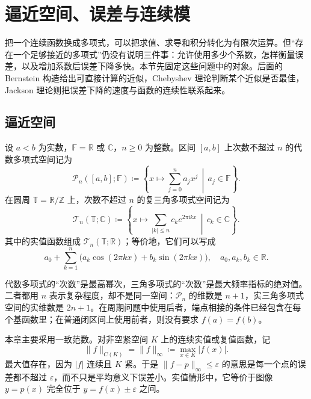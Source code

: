 \section{逼近空间、误差与连续模}
\label{b2:sec:approximation-spaces-errors}

把一个连续函数换成多项式，可以把求值、求导和积分转化为有限次运算。但“存在一个足够接近的多项式”仍没有说明三件事：允许使用多少个系数，怎样衡量误差，以及增加系数后误差下降多快。本节先固定这些问题中的对象。后面的 Bernstein 构造给出可直接计算的近似，Chebyshev 理论判断某个近似是否最佳，Jackson 理论则把误差下降的速度与函数的连续性联系起来。

\subsection{逼近空间}
\label{b2:subsec:approximation-spaces}

\begin{definition}
\label{b2:def:approximation-spaces}
设 \(a<b\) 为实数，\(\mathbb F=\mathbb R\) 或 \(\mathbb C\)，\(n\geq0\) 为整数。区间 \([a,b]\) 上次数不超过 \(n\) 的代数多项式空间记为
\[
 \mathcal P_n([a,b];\mathbb F)
 \coloneqq
 \left\{x\longmapsto\sum_{j=0}^na_jx^j\,\middle|\,a_j\in\mathbb F\right\}.
\]
在圆周 \(\mathbb T=\mathbb R/\mathbb Z\) 上，次数不超过 \(n\) 的复三角多项式空间记为
\[
 \mathcal T_n(\mathbb T;\mathbb C)
 \coloneqq
 \left\{x\longmapsto\sum_{|k|\leq n}c_ke^{2\pi\mathrm{i}kx}
       \,\middle|\,c_k\in\mathbb C\right\}.
\]
其中的实值函数组成 \(\mathcal T_n(\mathbb T;\mathbb R)\)；等价地，它们可以写成
\[
 a_0+\sum_{k=1}^n\bigl(a_k\cos(2\pi kx)+b_k\sin(2\pi kx)\bigr),
 \quad a_0,a_k,b_k\in\mathbb R.
\]
\end{definition}

代数多项式的“次数”是最高幂次，三角多项式的“次数”是最大频率指标的绝对值。二者都用 \(n\) 表示复杂程度，却不是同一空间：\(\mathcal P_n\) 的维数是 \(n+1\)，实三角多项式空间的实维数是 \(2n+1\)。在周期问题中使用后者，端点相接的条件已经包含在每个基函数里；在普通闭区间上使用前者，则没有要求 \(f(a)=f(b)\)。

\ProseParagraphBreak
本章主要采用一致范数。对非空紧空间 \(K\) 上的连续实值或复值函数，记
\[
 \lVert f\rVert_{C(K)}=\lVert f\rVert_\infty
 \coloneqq\max_{x\in K}|f(x)|.
\]
最大值存在，因为 \(|f|\) 连续且 \(K\) 紧。于是 \(\lVert f-p\rVert_\infty\leq\varepsilon\) 的意思是每一个点的误差都不超过 \(\varepsilon\)，而不只是平均意义下误差小。实值情形中，它等价于图像 \(y=p(x)\) 完全位于 \(y=f(x)\pm\varepsilon\) 之间。

